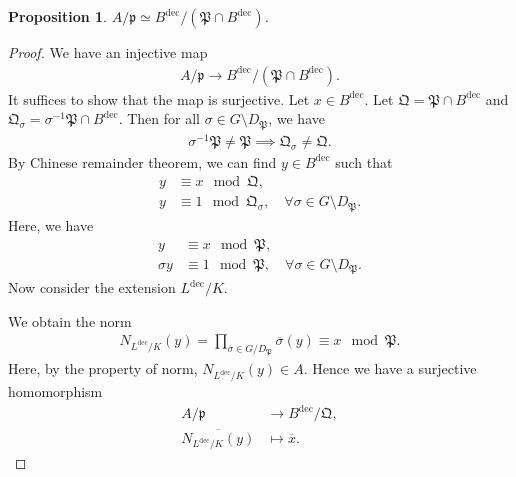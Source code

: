 \documentclass[12pt]{report}
\theoremstyle{plain}
\newtheorem{proposition}[theorem]{Proposition}
\theoremstyle{remark}
\theoremstyle{definition}
\begin{document}
\begin{proposition}
    $A/\mathfrak{p}\simeq B^\mathrm{dec}/(\mathfrak{P}\cap B^\mathrm{dec})$.
\end{proposition}
\begin{proof}
    We have an injective map
    \begin{align*}
        A/\mathfrak{p} \to B^\mathrm{dec}/(\mathfrak{P}\cap B^\mathrm{dec}).
    \end{align*}
    It suffices to show that the map is surjective. Let $x\in B^\mathrm{dec}$. Let $\mathfrak{Q}=\mathfrak{P}\cap B^\mathrm{dec}$ and $\mathfrak{Q}_\sigma=\sigma^{-1}\mathfrak{P}\cap B^\mathrm{dec}$. Then for all $\sigma\in G\setminus D_\mathfrak{P}$, we have
    \begin{align*}
        \sigma^{-1}\mathfrak{P}\neq \mathfrak{P} \implies \mathfrak{Q}_\sigma \neq \mathfrak{Q}.
    \end{align*}
    By Chinese remainder theorem, we can find $y\in B^\mathrm{dec}$ such that
    \begin{align*}
        y&\equiv x\mod \mathfrak{Q}, \\
        y&\equiv 1\mod \mathfrak{Q}_{\sigma},\quad \forall \sigma\in G\setminus D_\mathfrak{P}.
    \end{align*}
    Here, we have
    \begin{align*}
        y&\equiv x\mod \mathfrak{P}, \\
        \sigma y&\equiv 1\mod \mathfrak{P},\quad \forall \sigma\in G\setminus D_\mathfrak{P}. 
    \end{align*}
    Now consider the extension $L^\mathrm{dec}/K$.
    \begin{figure}[H]
        \centering
    \end{figure}
    \noindent We obtain the norm
    \begin{align*}
        N_{L^\mathrm{dec}/K}(y) = \prod_{\overline{\sigma}\in G/D_\mathfrak{P}} \overline{\sigma}(y) \equiv x\mod \mathfrak{P}.
    \end{align*}
    Here, by the property of norm, $N_{L^\mathrm{dec}/K}(y)\in A$. Hence we have a surjective homomorphism
    \begin{align*}
        A/\mathfrak{p} &\to B^\mathrm{dec}/\mathfrak{Q}, \\
        \overline{N_{L^\mathrm{dec}/K}(y)} &\mapsto \overline{x}.
    \end{align*}
\end{proof}
\end{document}
